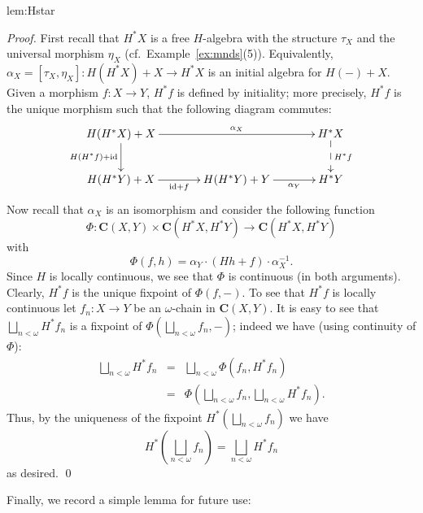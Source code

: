 \documentclass[oribibl,envcountsame,envcountsect,runningheads]{llncs}
\newcommand{\cat}[1]{\ensuremath{\mathbf{#1}}}
\newcommand{\free}[1]{{#1^*}}
\renewcommand{\>}{\rangle}
\def\id{\mathrm{id}}
\newenvironment{proposition_for}[2][\empty]{\bigskip\noindent{\bf
    Proposition~\ref{#2}}\ifthenelse{\equal{#1}{\empty}}{{\bf.}}{ {\bf
      (#1).}}\it}{\vspace{0.5cm}}
\begin{document}
\begin{proposition_for}{lem:Hstar}
 \lemHstar
\end{proposition_for}
\begin{proof}
  First recall that $\free{H} X$ is a free $H$-algebra with the
  structure $\tau_X$ and the universal morphism $\eta_X$
  (cf.~Example~\ref{ex:mnds}(5)). Equivalently, $\alpha_X = [\tau_X,
  \eta_X]: H(\free{H} X) + X \to \free{H} X$ is an initial algebra for
  $H(-) +X$. Given a morphism $f: X \to Y$, $\free{H} f$ is defined by
  initiality; more precisely, $\free{H} f$ is the unique morphism such
  that the following diagram commutes:
  \[
  \xymatrix@C+1pc{
    H(\free H X) + X \ar[rr]^-{\alpha_X}
    \ar[d]_{H(\free H f) + \id}
    &&
    \free H X
    \ar@{-->}[d]^{\free H f}
    \\
    H(\free H Y) + X
    \ar[r]_-{\id +f }
    &
    H(\free H Y) + Y
    \ar[r]_-{\alpha_Y}
    &
    \free H Y
    }
  \]
  Now recall that $\alpha_X$ is an isomorphism and consider the following function
  \[
  \Phi: \cat C(X,Y) \times \cat C(\free H X, \free H Y) \to \cat
  C(\free H X, \free H Y)
  \]
  with
  \[
  \Phi(f,h) = \alpha_Y \cdot (Hh + f) \cdot \alpha_X^{-1}.
  \]
  Since $H$ is locally continuous, we see that $\Phi$ is continuous (in
  both arguments). Clearly, $\free H f$ is the unique fixpoint of $\Phi(f, -)$. To see that $\free H f$ is
  locally continuous let $f_n: X \to Y$ be an $\omega$-chain in $\cat
  C(X,Y)$. It is easy to see that $\bigsqcup_{n < \omega} \free H f_n$
  is a fixpoint of $\Phi\left(\bigsqcup_{n< \omega} f_n,-\right)$; indeed we
  have (using continuity of $\Phi$):
  \begin{eqnarray*}
    \bigsqcup\limits_{n < \omega} \free H f_n
    & = & \bigsqcup\limits_{n < \omega} \Phi(f_n, \free H f_n) \\
    & = & \Phi\left(\bigsqcup\limits_{n < \omega} f_n,
      \bigsqcup\limits_{n < \omega}  \free H f_n\right).
  \end{eqnarray*}
  Thus, by the uniqueness of the fixpoint $\free
  H\left(\bigsqcup_{n < \omega} f_n\right)$ we have
  \[
  \free H\left(\bigsqcup\limits_{n < \omega} f_n \right) =
  \bigsqcup\limits_{n < \omega} \free H f_n
  \]
  as desired. \qed
\end{proof}

Finally, we record a simple lemma for future use:
\end{document}
